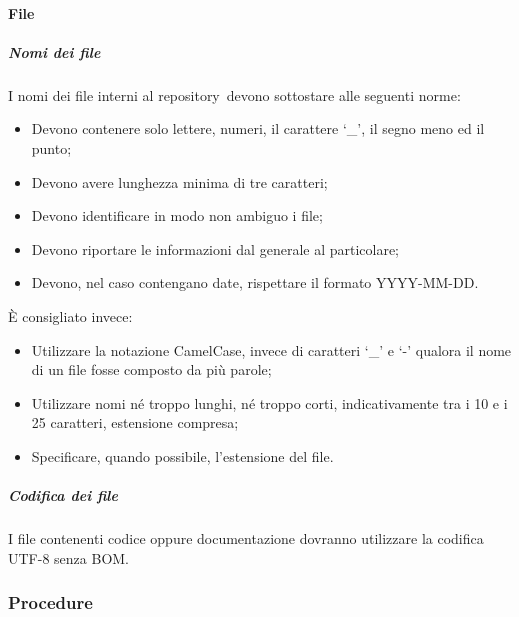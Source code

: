 \documentclass[../NormeProgetto.tex]{subfiles}
\begin{document}
	\paragraph{File}	
		\subparagraph{Nomi dei file}
	I nomi dei file interni al repository\g\ devono sottostare alle seguenti norme:
	\begin{itemize}
		\item Devono contenere solo lettere, numeri, il carattere `\_', il segno meno ed il punto;
		\item Devono avere lunghezza minima di tre caratteri;
		\item Devono identificare in modo non ambiguo i file;
		\item Devono riportare le informazioni dal generale al particolare;
		\item Devono, nel caso contengano date, rispettare il formato YYYY-MM-DD.
	\end{itemize}
	È consigliato invece:
	\begin{itemize}
		\item Utilizzare la notazione CamelCase\g, invece di caratteri `\_' e `-' qualora il nome di un file fosse composto da più parole;
		\item Utilizzare nomi né troppo lunghi, né troppo corti, indicativamente tra i 10 e i 25 caratteri, estensione compresa;
		\item Specificare, quando possibile, l'estensione del file.
	\end{itemize}
		\subparagraph{Codifica dei file}
	I file contenenti codice oppure documentazione dovranno utilizzare la codifica UTF-8 senza BOM\g.
	\subsubsection{Procedure}
\end{document}
